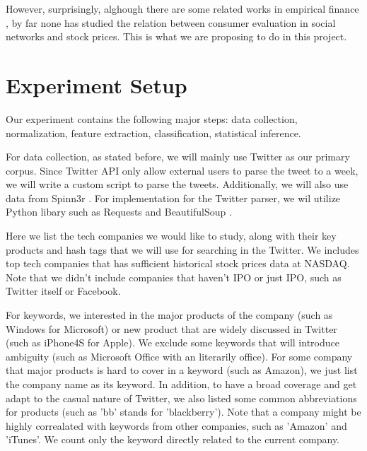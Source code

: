\documentclass[12pt]{article}
\begin{document}
However, surprisingly, alghough there are some related works in empirical finance \cite{Brown:04}, by far none has studied the relation between consumer evaluation in social networks and stock prices. This is what we are proposing to do in this project.

\section{Experiment Setup}
Our experiment contains the following major steps: data collection, normalization, feature extraction, classification, statistical inference.

For data collection, as stated before, we will mainly use Twitter as our primary corpus. Since Twitter API only allow external users to parse the tweet to a week, we will write a custom script to parse the tweets. Additionally, we will also use data from Spinn3r \cite{Spinn3r}. For implementation for the Twitter parser, we wil utilize Python libary such as Requests \cite{Requests} and BeautifulSoup \cite{BeautifulSoup}.

Here we list the tech companies we would like to study, along with their key products and hash tags that we will use for searching in the Twitter. We includes top tech companies that has sufficient historical stock prices data at NASDAQ. Note that we didn't include companies that haven't IPO or just IPO, such as Twitter itself or Facebook.

For keywords, we interested in the major products of the company (such as Windows for Microsoft) or new product that are widely discussed in Twitter (such as iPhone4S for Apple). We exclude some keywords that will introduce ambiguity (such as Microsoft Office with an literarily office). For some company that major products is hard to cover in a keyword (such as Amazon), we just list the company name as its keyword. In addition, to have a broad coverage and get adapt to the casual nature of Twitter, we also listed some common abbreviations for products (such as 'bb' stands for 'blackberry'). Note that a company might be highly correalated with keywords from other companies, such as 'Amazon' and 'iTunes'. We count only the keyword directly related to the current company.
\end{document}
